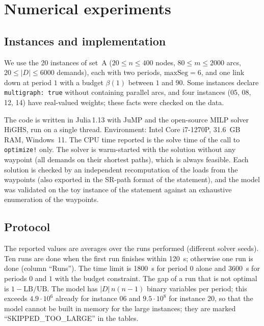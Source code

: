\documentclass[11pt,a4paper]{article}
\begin{document}
\section{Numerical experiments}
\subsection{Instances and implementation}
We use the 20 instances of set~A ($20\le n\le 400$ nodes, $80\le m\le 2000$ arcs, $20\le |D|\le 6000$ demands), each with two periods, $\mathrm{maxSeg}=6$, and one link down at period $1$ with a budget $\beta(1)$ between $1$ and $90$. Some instances declare \texttt{multigraph: true} without containing parallel arcs, and four instances (05, 08, 12, 14) have real-valued weights; these facts were checked on the data.

The code is written in Julia\,1.13 with JuMP and the open-source MILP solver HiGHS, run on a single thread. Environment: Intel Core i7-1270P, 31.6~GB RAM, Windows~11. The CPU time reported is the solve time of the call to \texttt{optimize!} only. The solver is warm-started with the solution without any waypoint (all demands on their shortest paths), which is always feasible. Each solution is checked by an independent recomputation of the loads from the waypoints (also exported in the SR-path format of the statement), and the model was validated on the toy instance of the statement against an exhaustive enumeration of the waypoints.

\subsection{Protocol}
The reported values are averages over the runs performed (different solver seeds). Ten runs are done when the first run finishes within 120~s; otherwise one run is done (column ``Runs''). The time limit is 1800~s for period $0$ alone and 3600~s for periods $0$ and $1$ with the budget constraint. The gap of a run that is not optimal is $1-\mathrm{LB}/\mathrm{UB}$.
The model has $|D|\,n(n-1)$ binary variables per period; this exceeds $4.9\cdot 10^6$ already for instance 06 and $9.5\cdot10^8$ for instance 20, so that the model cannot be built in memory for the large instances; they are marked ``SKIPPED\_TOO\_LARGE'' in the tables.

\end{document}

